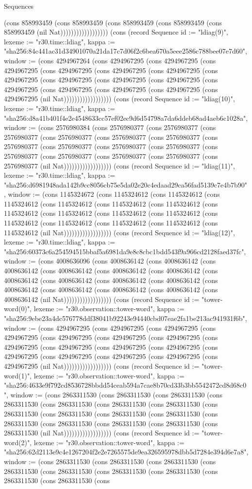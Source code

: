 \begin{lexlean}{Sequences}
\begin{semanticmodule}
{(cons 858993459 (cons 858993459 (cons 858993459 (cons 858993459 (cons 858993459 (nil Nat)))))))))))))))))}) (cons (record Sequence {id := "ldiag(9)", lexeme := "r30.time::ldiag", kappa := "sha256:84c441ac31d34901070a21da17c7d06f2c6bea670a5eee2586c788bee07e7d60", window := (cons 4294967264 (cons 4294967295 (cons 4294967295 (cons 4294967295 (cons 4294967295 (cons 4294967295 (cons 4294967295 (cons 4294967295 (cons 4294967295 (cons 4294967295 (cons 4294967295 (cons 4294967295 (cons 4294967295 (cons 4294967295 (cons 4294967295 (cons 4294967295 (nil Nat)))))))))))))))))}) (cons (record Sequence {id := "ldiag(10)", lexeme := "r30.time::ldiag", kappa := "sha256:d8a41b401f4e2e4548633cc57ef02ec9d6d54798a7da6ddeb68ad4aeb6c1028a", window := (cons 2576980384 (cons 2576980377 (cons 2576980377 (cons 2576980377 (cons 2576980377 (cons 2576980377 (cons 2576980377 (cons 2576980377 (cons 2576980377 (cons 2576980377 (cons 2576980377 (cons 2576980377 (cons 2576980377 (cons 2576980377 (cons 2576980377 (cons 2576980377 (nil Nat)))))))))))))))))}) (cons (record Sequence {id := "ldiag(11)", lexeme := "r30.time::ldiag", kappa := "sha256:d6981948ada142b9cc8056cb75e5da02e20c4edaad29ca56fad5139c7e4b7b90", window := (cons 1145324672 (cons 1145324612 (cons 1145324612 (cons 1145324612 (cons 1145324612 (cons 1145324612 (cons 1145324612 (cons 1145324612 (cons 1145324612 (cons 1145324612 (cons 1145324612 (cons 1145324612 (cons 1145324612 (cons 1145324612 (cons 1145324612 (cons 1145324612 (nil Nat)))))))))))))))))}) (cons (record Sequence {id := "ldiag(12)", lexeme := "r30.time::ldiag", kappa := "sha256:60373c6a254594515bbaf5a6981da9e8c8cbc1bdd543f9a966cd2128faed37fc", window := (cons 4008636096 (cons 4008636142 (cons 4008636142 (cons 4008636142 (cons 4008636142 (cons 4008636142 (cons 4008636142 (cons 4008636142 (cons 4008636142 (cons 4008636142 (cons 4008636142 (cons 4008636142 (cons 4008636142 (cons 4008636142 (cons 4008636142 (cons 4008636142 (nil Nat)))))))))))))))))}) (cons (record Sequence {id := "tower-word(0)", lexeme := "r30.observation::tower-word", kappa := "sha256:9ebe23a4dc576778ddf38041b92243e94440cbd07eae2fa1be213ac941931f6b", window := (cons 4294967295 (cons 4294967295 (cons 4294967295 (cons 4294967295 (cons 4294967295 (cons 4294967295 (cons 4294967295 (cons 4294967295 (cons 4294967295 (cons 4294967295 (cons 4294967295 (cons 4294967295 (cons 4294967295 (cons 4294967295 (cons 4294967295 (cons 4294967295 (nil Nat)))))))))))))))))}) (cons (record Sequence {id := "tower-word(1)", lexeme := "r30.observation::tower-word", kappa := "sha256:4633e9f792cd8536728bbdd54ceab594a7cae8b70cd33b3bb5542472cd8d68c0", window := (cons 2863311530 (cons 2863311530 (cons 2863311530 (cons 2863311530 (cons 2863311530 (cons 2863311530 (cons 2863311530 (cons 2863311530 (cons 2863311530 (cons 2863311530 (cons 2863311530 (cons 2863311530 (cons 2863311530 (cons 2863311530 (cons 2863311530 (cons 2863311530 (nil Nat)))))))))))))))))}) (cons (record Sequence {id := "tower-word(2)", lexeme := "r30.observation::tower-word", kappa := "sha256:62d2113e9c4e1267204f2e2e7265575de9ea326595978dbb5d7284e394d6e7a8", window := (cons 2863311530 (cons 2863311530 (cons 2863311530 (cons 2863311530 (cons 2863311530 (cons 2863311530 (cons 2863311530 (cons 2863311530 (cons 2863311530 (cons }
\end{semanticmodule}
\end{lexlean}
